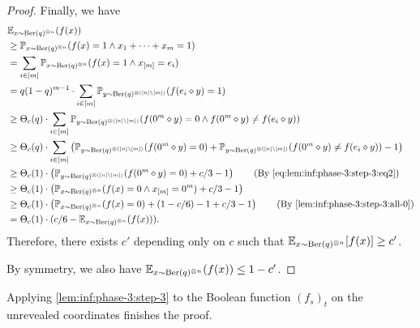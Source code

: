 \begin{proof}
    Finally, we have
    \begin{align*}
    &\bE_{x \sim \Ber(q)^{\otimes n}}(f(x))\\
    &\ge \bP_{x \sim \Ber(q)^{\otimes n}}(f(x) = 1 \wedge x_1 + \cdots + x_m = 1)\\
    &= \sum_{i\in [m]} \bP_{x \sim \Ber(q)^{\otimes n}}(f(x) = 1 \wedge x_{[m]} = e_i)\\
    &= q (1-q)^{m-1} \cdot \sum_{i\in [m]} \bP_{y \sim \Ber(q)^{\otimes ([n]\backslash [m])}}(f(e_i \diamond y) = 1)\\
    &\ge  \Theta_c(q) \cdot \sum_{i\in [m]} \bP_{y \sim \Ber(q)^{\otimes ([n]\backslash [m])}}(f(0^m \diamond y) = 0 \wedge f(0^m \diamond y) \ne f(e_i \diamond y))\\
    &\ge  \Theta_c(q) \cdot \sum_{i\in [m]} \left( \bP_{y \sim \Ber(q)^{\otimes ([n]\backslash [m])}}(f(0^m \diamond y) = 0) +  \bP_{y \sim \Ber(q)^{\otimes ([n]\backslash [m])}} (f(0^m \diamond y) \ne f(e_i \diamond y)) - 1\right)\\
    &\ge  \Theta_c(1) \cdot \left( \bP_{y \sim \Ber(q)^{\otimes ([n]\backslash [m])}}(f(0^m \diamond y) = 0) +  c / 3 - 1\right) \tag{By \cref{eq:lem:inf:phase-3:step-3:eq2}}\\
    &\ge  \Theta_c(1) \cdot \left( \bP_{x \sim \Ber(q)^{\otimes n}}(f(x) = 0 \wedge x_{[m]}=0^m) +  c / 3 - 1\right)\\
    &\ge  \Theta_c(1) \cdot \left( \bP_{x \sim \Ber(q)^{\otimes n}}(f(x) = 0) + (1 - c / 6) - 1 +  c / 3 - 1\right) \tag{By \cref{lem:inf:phase-3:step-3:all-0}}\\
    &= \Theta_c(1) \cdot (c/6 -  \bE_{x \sim \Ber(q)^{\otimes n}}(f(x))).
    \end{align*}
    Therefore, there exists $c'$ depending only on $c$ such that $\mathbb{E}_{x \sim \operatorname{\mathrm{Ber}}(q)^{\otimes n}}[f(x)] \ge c'$.

    By symmetry, we also have $\mathbb{E}_{x \sim \operatorname{\mathrm{Ber}}(q)^{\otimes n}}(f(x)) \le 1 - c'$.
\end{proof}

Applying \cref{lem:inf:phase-3:step-3} to the Boolean function $(f_s)_t$ on the unrevealed coordinates finishes the proof.
